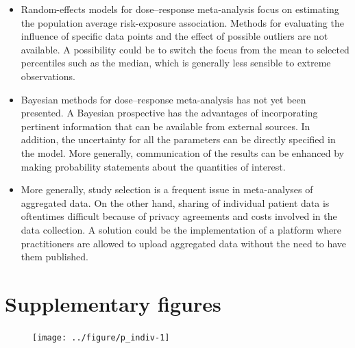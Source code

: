 \documentclass[11pt,a4paper,twoside,openany]{book}\usepackage{knitr}
\begin{document}
{\begin{itemize}
\item Random-effects models for dose--response meta-analysis focus on estimating the population average risk-exposure association. Methods for evaluating the influence of specific data points and the effect of possible outliers are not available. A possibility could be to switch the focus from the mean to selected percentiles such as the median, which is generally less sensible to extreme observations.

\item Bayesian methods for dose--response meta-analysis has not yet been presented. A Bayesian prospective has the advantages of incorporating pertinent information that can be available from external sources. In addition, the uncertainty for all the parameters can be directly specified in the model. More generally, communication of the results can be enhanced by making probability statements about the quantities of interest.

\item More generally, study selection is a frequent issue in meta-analyses of aggregated data. On the other hand, sharing of individual patient data is oftentimes difficult because of privacy agreements and costs involved in the data collection. A solution could be the implementation of a platform where practitioners are allowed to upload aggregated data without the need to have them published.

\end{itemize}

\appendix


%

\chapter{Supplementary figures}

\begin{knitrout}\footnotesize
{}\color{fgcolor}\begin{figure}[ht!]

{\centering \texttt{[image: ../figure/p\_indiv-1]} 

}


\end{figure}
\end{knitrout}}
\end{document}
